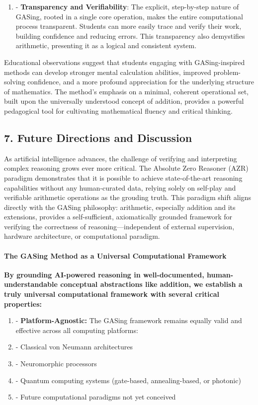 \begin{enumerate}
  \item - \textbf{Transparency and Verifiability}: The explicit, step-by-step nature of GASing, rooted in a single core operation, makes the entire computational process transparent. Students can more easily trace and verify their work, building confidence and reducing errors. This transparency also demystifies arithmetic, presenting it as a logical and consistent system.
\end{enumerate}

Educational observations suggest that students engaging with GASing-inspired methods can develop stronger mental calculation abilities, improved problem-solving confidence, and a more profound appreciation for the underlying structure of mathematics. The method's emphasis on a minimal, coherent operational set, built upon the universally understood concept of addition, provides a powerful pedagogical tool for cultivating mathematical fluency and critical thinking.

\subsection{7. Future Directions and Discussion}
As artificial intelligence advances, the challenge of verifying and interpreting complex reasoning grows ever more critical. The Absolute Zero Reasoner (AZR) paradigm demonstrates that it is possible to achieve state-of-the-art reasoning capabilities without any human-curated data, relying solely on self-play and verifiable arithmetic operations as the grouding truth. This paradigm shift aligns directly with the GASing philosophy: arithmetic, especially addition and its extensions, provides a self-sufficient, axiomatically grounded framework for verifying the correctness of reasoning—independent of external supervision, hardware architecture, or computational paradigm.

\paragraph{The GASing Method as a Universal Computational Framework}
\textbf{By grounding AI-powered reasoning in well-documented, human-understandable conceptual abstractions like addition, we establish a truly universal computational framework with several critical properties:}

\begin{enumerate}
  \item - \textbf{Platform-Agnostic:} The GASing framework remains equally valid and effective across all computing platforms:
  \item - Classical von Neumann architectures
  \item - Neuromorphic processors
  \item - Quantum computing systems (gate-based, annealing-based, or photonic)
  \item - Future computational paradigms not yet conceived
\end{enumerate}

